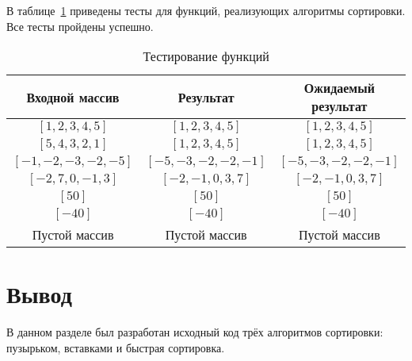 В таблице~\ref{tbl:test} приведены тесты для функций, реализующих алгоритмы сортировки.
Все тесты пройдены успешно.

\begin{table}[h!]
    \begin{center}
        \begin{threeparttable}
            \captionsetup{justification=raggedright,singlelinecheck=off}
            \caption{\label{tbl:test}Тестирование функций}
            \begin{tabular}{|c|c|c|}
                \hline
                Входной массив & Результат & Ожидаемый результат \\
                \hline
                $[1, 2, 3, 4, 5]$ & $[1, 2, 3, 4, 5]$  & $[1, 2, 3, 4, 5]$\\\hline
                $[5, 4, 3, 2, 1]$  & $[1, 2, 3, 4, 5]$ & $[1, 2, 3, 4, 5]$\\\hline
                $[-1, -2, -3, -2, -5]$  & $[-5, -3, -2, -2, -1]$  & $[-5, -3, -2, -2, -1]$\\\hline
                $[-2, 7, 0, -1, 3]$  & $[-2, -1, 0, 3, 7]$  & $[-2, -1, 0, 3, 7]$\\\hline
                $[50]$  & $[50]$  & $[50]$\\\hline
                $[-40]$  & $[-40]$  & $[-40]$\\\hline
                Пустой массив  & Пустой массив  & Пустой массив\\
                \hline
            \end{tabular}
        \end{threeparttable}
    \end{center}
\end{table}
\newpage
\section*{Вывод}

В данном разделе был разработан исходный код трёх алгоритмов сортировки: пузырьком, вставками и быстрая сортировка.

